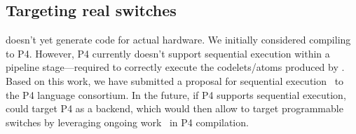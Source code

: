 \subsection{Targeting real switches}
\label{ss:real}
\pktlanguage doesn't yet generate code for actual hardware. We initially
considered compiling \pktlanguage to P4. However, P4 currently doesn't support
sequential execution within a pipeline stage---required to correctly execute
the codelets/atoms produced by \pktlanguage. Based on this work, we have
submitted a proposal for sequential execution~\cite{p4-semantics} to the P4
language consortium. In the future, if P4 supports sequential execution,
\pktlanguage could target P4 as a backend, which would then allow \pktlanguage
to target programmable switches by leveraging ongoing work~\cite{netronome,
xilinx,lavanya_compiler} in P4 compilation.
